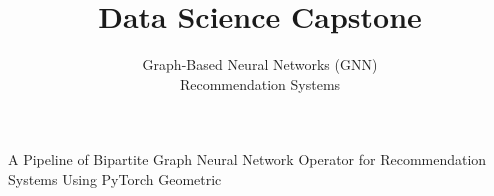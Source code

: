 \documentclass{beamer}
\date[] %
\begin{document}
\lstset{language=Python}

\title{Data Science Capstone}
\subtitle{Graph-Based Neural Networks (GNN) \\  Recommendation Systems}
\date{}

\frame{\titlepage}


\begin{frame}
\frametitle{}
\huge \center A Pipeline of Bipartite Graph Neural Network Operator for Recommendation Systems Using PyTorch Geometric
\end{frame}







%     




\end{document}

